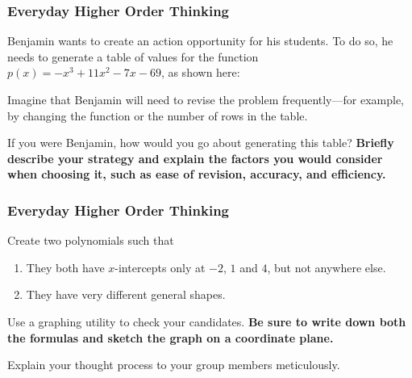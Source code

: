 \documentclass[10pt, aspectratio=169]{beamer}
\begin{document}
\begin{frame}
\frametitle{Everyday Higher Order Thinking}
Benjamin wants to create an action opportunity for his students. To do so, he needs to generate a table of values for the function $p(x) = -x^3 + 11x^2 - 7x - 69$, as shown here:

\small


\Large

Imagine that Benjamin will need to revise the problem frequently---for example, by changing the function or the number of rows in the table.

If you were Benjamin, how would you go about generating this table? \textbf{\color{red} Briefly describe your strategy and explain the factors you would consider when choosing it, such as ease of revision, accuracy, and efficiency.}

\end{frame}
\begin{frame}
\frametitle{Everyday Higher Order Thinking}
Create two polynomials such that 
\begin{enumerate}[leftmargin=*, label=(\alph*)]
\item
They both have $x$-intercepts only at $-2$, $1$ and $4$, but not anywhere else.
\item 
They have very different general shapes.
\end{enumerate}
Use a graphing utility to check your candidates. \textbf{\color{red}Be sure to write down both the formulas and sketch the graph on a coordinate plane.}

Explain your thought process to your group members meticulously.
\end{frame}
\end{document}
